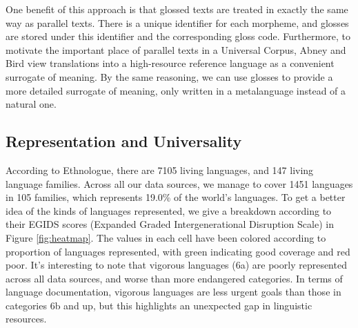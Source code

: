 One benefit of this approach is that glossed texts are treated in exactly the same way as parallel texts.  There is a unique identifier for each morpheme, and glosses are stored under this identifier and the corresponding gloss code.  Furthermore, to motivate the important place of parallel texts in a Universal Corpus, Abney and Bird view translations into a high-resource reference language as a convenient surrogate of meaning. By the same reasoning, we can use glosses to provide a more detailed surrogate of meaning, only written in a metalanguage instead of a natural one.



\subsection{Representation and Universality} \label{sec:stats}

According to Ethnologue, there are 7105 living languages, and 147 living language families. Across all our data sources, we manage to cover 1451 languages in 105 families, which represents 19.0\% of the world's languages. To get a better idea of the kinds of languages represented, we give a breakdown according to their EGIDS scores (Expanded Graded Intergenerational Disruption Scale) \cite{lewis2010assessing} in Figure \ref{fig:heatmap}. The values in each cell have been colored according to proportion of languages represented, with green indicating good coverage and red poor. It's interesting to note that vigorous languages (6a) are poorly represented across all data sources, and worse than more endangered categories. In terms of language documentation, vigorous languages are less urgent goals than those in categories 6b and up, but this highlights an unexpected gap in linguistic resources.